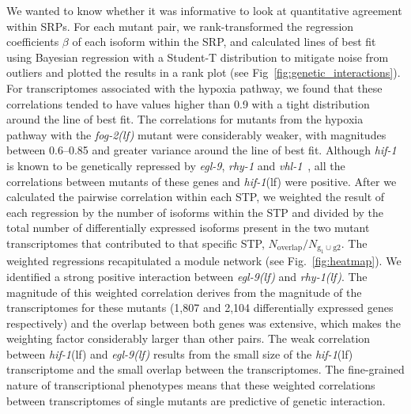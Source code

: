 \documentclass[9pt,twocolumn,twoside]{pnas-new}
\newcommand{\gene}[1]{\emph{#1}}
\newcommand{\fog}{\emph{\mbox{fog-2(lf)}}}
\newcommand{\egl}{\emph{\mbox{egl-9}(lf)}}
\newcommand{\rhy}{\emph{\mbox{rhy-1}(lf)}}
\newcommand{\vhl}{\emph{\mbox{vhl-1}(lf)}}
\newcommand{\hif}{\emph{\mbox{hif-1}}(lf)}
\newcommand{\egln}{1,807}
\newcommand{\rhyn}{2,104}
\begin{document}
We wanted to know whether it was informative to look at quantitative agreement
within SRPs. For each mutant pair, we rank-transformed
the regression coefficients $\beta$ of each isoform within the SRP, and
calculated lines of best fit using Bayesian regression with a Student-T
distribution to mitigate noise from outliers and plotted the results in a rank plot
(see Fig~\ref{fig:genetic_interactions}). For transcriptomes associated with the
hypoxia pathway, we found that these correlations tended to have
values higher than 0.9 with a tight distribution around the line of best fit.
The correlations for mutants from the hypoxia pathway
with the \fog{} mutant were considerably weaker, with magnitudes between
0.6--0.85 and greater variance around the line of best fit.
Although \gene{hif-1} is known to be genetically repressed by \gene{egl-9}, \gene{rhy-1} and
\gene{vhl-1}~\cite{Epstein2001,Shen2006}, all the correlations
between mutants of these genes and \hif{} were positive.
After we calculated the pairwise correlation within each STP,
we weighted the result of each regression by the
number of isoforms within the STP and
divided by the total number of differentially expressed isoforms present in the
two mutant transcriptomes that contributed to that specific STP,
$N_\mathrm{overlap}/N_{\mathrm{g_1} \cup \mathrm{g2}}$.
The weighted regressions recapitulated a module network (see Fig.~\ref{fig:heatmap}).
We identified a strong positive interaction between \egl{} and \rhy{}.
The magnitude of this weighted correlation derives from the magnitude of the
transcriptomes for these mutants (\egln{} and \rhyn{} differentially expressed
genes respectively) and the overlap between both genes was
extensive, which makes the weighting factor considerably larger than other pairs.
The weak correlation between \hif{} and \egl{} results from the small size of
the \hif{} transcriptome and the small overlap between the transcriptomes.
The fine-grained nature of transcriptional phenotypes means that these weighted
correlations between transcriptomes of single mutants are predictive of genetic
interaction.
\end{document}
